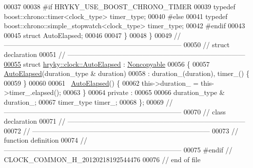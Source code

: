 \begin{DoxyCode}
00037     
00038 \textcolor{preprocessor}{#if HRYKY\_USE\_BOOST\_CHRONO\_TIMER}
00039 \textcolor{preprocessor}{}    \textcolor{keyword}{typedef} boost::chrono::timer<clock\_type>            timer\_type;
00040 \textcolor{preprocessor}{#else}
00041 \textcolor{preprocessor}{}    \textcolor{keyword}{typedef} boost::chrono::simple\_stopwatch<clock\_type> timer\_type;
00042 \textcolor{preprocessor}{#endif}
00043 \textcolor{preprocessor}{}
00045     \textcolor{keyword}{struct }AutoElapsed;
00046     
00047 \}
00048 \}
00049 \textcolor{comment}{//
      ------------------------------------------------------------------------------}
00050 \textcolor{comment}{// struct declaration}
00051 \textcolor{comment}{//
      ------------------------------------------------------------------------------}
\hypertarget{clock__common_8h_source_l00055}{}\hyperlink{structhryky_1_1clock_1_1_auto_elapsed}{00055} \textcolor{comment}{}\textcolor{keyword}{struct }\hyperlink{structhryky_1_1clock_1_1_auto_elapsed}{hryky::clock::AutoElapsed} : \hyperlink{classhryky_1_1_noncopyable}{Noncopyable}
00056 \{
00057     \hyperlink{structhryky_1_1clock_1_1_auto_elapsed}{AutoElapsed}(duration\_type & duration)
00058         : duration\_(duration), timer\_() \{
00059     \}
00060 
00061     ~\hyperlink{structhryky_1_1clock_1_1_auto_elapsed}{AutoElapsed}() \{
00062         this->duration\_ = this->timer\_.elapsed();
00063     \}
00064 \textcolor{keyword}{private} :
00065 
00066     duration\_type &         duration\_;
00067     timer\_type              timer\_;
00068 \};
00069 \textcolor{comment}{//
      ------------------------------------------------------------------------------}
00070 \textcolor{comment}{// class declaration}
00071 \textcolor{comment}{//
      ------------------------------------------------------------------------------}
00072 \textcolor{comment}{//
      ------------------------------------------------------------------------------}
00073 \textcolor{comment}{// function definition}
00074 \textcolor{comment}{//
      ------------------------------------------------------------------------------}
00075 \textcolor{preprocessor}{#endif // CLOCK\_COMMON\_H\_20120218192544476}
00076 \textcolor{preprocessor}{}\textcolor{comment}{// end of file}
\end{DoxyCode}
